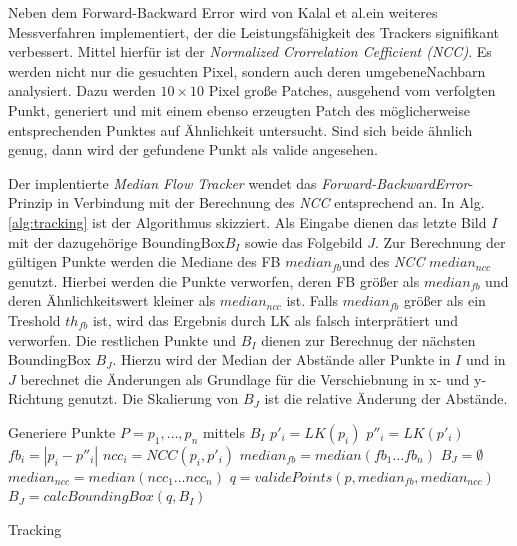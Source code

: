 	Neben dem Forward-Backward Error wird von Kalal et al.\cite{TLD}ein weiteres Messverfahren implementiert, der die Leistungsfähigkeit des Trackers signifikant verbessert\cite{MFT}. Mittel hierfür ist der \textit{Normalized Crorrelation Cefficient (NCC)}. %
	Es werden nicht nur die gesuchten Pixel, sondern auch deren umgebeneNachbarn analysiert. Dazu werden $10\times10$ Pixel große Patches, ausgehend vom verfolgten Punkt, generiert und mit einem ebenso erzeugten Patch des möglicherweise entsprechenden Punktes auf Ähnlichkeit untersucht. Sind sich beide ähnlich genug, dann wird der gefundene Punkt als valide angesehen.

	Der implentierte \textit{Median Flow Tracker} wendet das \textit{Forward-BackwardError}-Prinzip in Verbindung mit der Berechnung des \textit{NCC} entsprechend \cite{key-5} an. In Alg.\ref{alg:tracking} ist der Algorithmus skizziert. Als Eingabe dienen das letzte Bild $I$ mit der dazugehörige BoundingBox$B_{I}$ sowie das Folgebild $J$. Zur Berechnung der gültigen Punkte werden die Mediane des FB $median_{fb}$und des \textit{NCC} $median_{ncc}$genutzt. Hierbei werden die Punkte verworfen, deren FB größer als $median_{fb}$ und deren Ähnlichkeitswert kleiner als $median_{ncc}$ ist. Falls $median_{fb}$ größer als ein Treshold $th_{fb}$ ist, wird das Ergebnis durch LK als falsch interprätiert und verworfen. Die restlichen Punkte und $B_{I}$ dienen zur Berechnug der nächsten BoundingBox $B_{J}$. Hierzu wird der Median der Abstände aller Punkte in $I$ und in $J$ berechnet die Änderungen als Grundlage für die Verschiebnung in x- und y-Richtung genutzt. Die Skalierung von $B_{J}$ ist die relative
	Änderung der Abstände.

	\begin{algorithm}[H]
	\vspace{0.2cm}
	Generiere Punkte $P = p_{1},\ldots,p_{n}$ mittels $B_{I}$\;
	 {
		$p'_{i}=LK(p_{i})$\;
		$p''_{i}=LK(p'_{i})$\;
		$fb_{i}=|p_{i}-p''_{i}|$\;
		$ncc_{i}=NCC(p_{i},p'_{i})$\;
	}
	$median_{fb}=median(fb_{1}\ldots fb_{n})$\;
	 { 
		$B_{J}=\emptyset$\;
	} {
		$median_{ncc}=median(ncc_{1}\dots ncc_{n})$\;
		$q=validePoints(p,median_{fb},median_{ncc})$\;
		$B_{J}=calcBoundingBox(q,B_{I})$\;
	}
	\caption{Tracking}
	\label{alg:tracking}
	\vspace{0.2cm}
	\end{algorithm}

